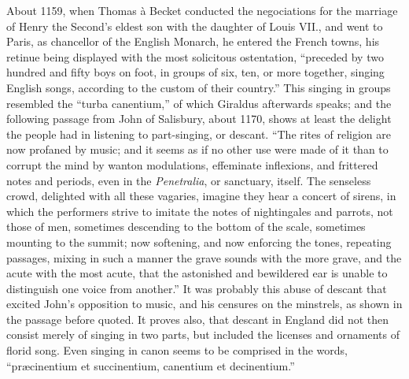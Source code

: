 About 1159, when Thomas à Becket conducted the negociations for the
marriage of Henry the Second’s eldest son with the daughter of Louis VII., and
went to Paris, as chancellor of the English Monarch, he entered the French towns,
his retinue being displayed with the most solicitous ostentation, “preceded by two
hundred and fifty boys on foot, in groups of six, ten, or more together, singing
English songs, according to the custom of their country.” This singing in groups
resembled the “turba canentium,” of which Giraldus afterwards speaks; and the
following passage from John of Salisbury, about 1170, shows at least the delight
the people had in listening to part-singing, or descant. “The rites of religion
are now profaned by music; and it seems as if no other use were made of it than
to corrupt the mind by wanton modulations, effeminate inflexions, and frittered
notes and periods, even in the \textit{Penetralia}, or sanctuary, itself. The senseless
crowd, delighted with all these vagaries, imagine they hear a concert of sirens,
in which the performers strive to imitate the notes of nightingales and parrots,
not those of men, sometimes descending to the bottom of the scale, sometimes
mounting to the summit; now softening, and now enforcing the tones, repeating
passages, mixing in such a manner the grave sounds with the more grave, and
the acute with the most acute, that the astonished and bewildered ear is unable
to distinguish one voice from another.” It was probably this abuse of descant
that excited John’s opposition to music, and his censures on the minstrels, as
shown in the passage before quoted. It proves also, that descant in England did
not then consist merely of singing in two parts, but included the licenses and
ornaments of florid song. Even singing in canon seems to be comprised in the
words, “præcinentium et succinentium, canentium et decinentium.”

